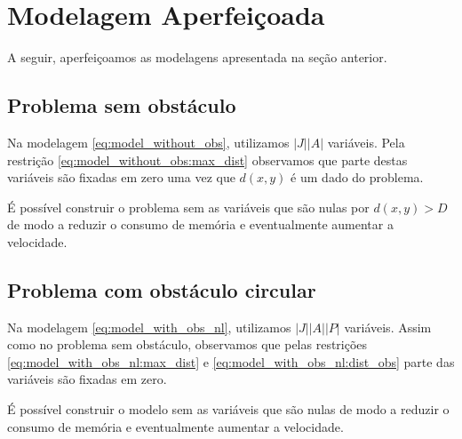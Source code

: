 %
%
%

\section{Modelagem Aperfei\c{c}oada}
A seguir, aperfei\c{c}oamos as modelagens apresentada na se\c{c}\~{a}o anterior.

\subsection{Problema sem obstáculo}
Na modelagem \eqref{eq:model_without_obs}, utilizamos $|J| |A|$ vari\'{a}veis.
Pela restri\c{c}\~{a}o \eqref{eq:model_without_obs:max_dist} observamos que
parte destas vari\'{a}veis s\~{a}o fixadas em zero uma vez que $d(x, y)$ \'{e}
um dado do problema.

\'{E} poss\'{i}vel construir o problema sem as vari\'{a}veis que s\~{a}o nulas
por $d(x, y) > D$ de modo a reduzir o consumo de mem\'{o}ria e eventualmente
aumentar a velocidade.

\subsection{Problema com obstáculo circular}
Na modelagem \eqref{eq:model_with_obs_nl}, utilizamos $|J| |A| |P|$
vari\'{a}veis. Assim como no problema sem obst\'{a}culo, observamos que pelas
restri\c{c}\~{o}es \eqref{eq:model_with_obs_nl:max_dist} e
\eqref{eq:model_with_obs_nl:dist_obs} parte das vari\'{a}veis s\~{a}o fixadas em
zero.

\'{E} poss\'{i}vel construir o modelo sem as vari\'{a}veis que s\~{a}o nulas de
modo a reduzir o consumo de mem\'{o}ria e eventualmente aumentar a velocidade.

